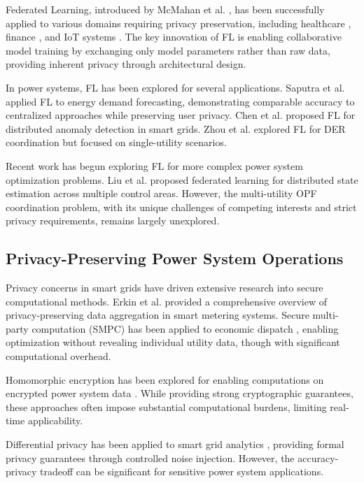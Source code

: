 \documentclass[journal,10pt]{IEEEtran}
\begin{document}
Federated Learning, introduced by McMahan et al. \cite{mcmahan2017communication}, has been successfully applied to various domains requiring privacy preservation, including healthcare \cite{kaissis2020secure}, finance \cite{liu2020federated}, and IoT systems \cite{yang2019federated}. The key innovation of FL is enabling collaborative model training by exchanging only model parameters rather than raw data, providing inherent privacy through architectural design.

In power systems, FL has been explored for several applications. Saputra et al. \cite{saputra2019energy} applied FL to energy demand forecasting, demonstrating comparable accuracy to centralized approaches while preserving user privacy. Chen et al. \cite{chen2019artificial} proposed FL for distributed anomaly detection in smart grids. Zhou et al. \cite{zhou2023federated} explored FL for DER coordination but focused on single-utility scenarios.

Recent work has begun exploring FL for more complex power system optimization problems. Liu et al. \cite{liu2022federated} proposed federated learning for distributed state estimation across multiple control areas. However, the multi-utility OPF coordination problem, with its unique challenges of competing interests and strict privacy requirements, remains largely unexplored.

\subsection{Privacy-Preserving Power System Operations}

Privacy concerns in smart grids have driven extensive research into secure computational methods. Erkin et al. \cite{erkin2013privacy} provided a comprehensive overview of privacy-preserving data aggregation in smart metering systems. Secure multi-party computation (SMPC) has been applied to economic dispatch \cite{li2010secure}, enabling optimization without revealing individual utility data, though with significant computational overhead.

Homomorphic encryption has been explored for enabling computations on encrypted power system data \cite{li2010secure}. While providing strong cryptographic guarantees, these approaches often impose substantial computational burdens, limiting real-time applicability.

Differential privacy has been applied to smart grid analytics \cite{dwork2014algorithmic}, providing formal privacy guarantees through controlled noise injection. However, the accuracy-privacy tradeoff can be significant for sensitive power system applications.
\end{document}
